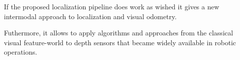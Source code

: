 \documentclass[doktyp=marbeit,fontsize=12pt,sprache=english,draft=true,hausschrift=true]{TUBAFarbeiten}
\begin{document}
If the proposed localization pipeline does work as wished it gives a new
intermodal approach to localization and visual odometry.

Futhermore, it allows to apply algorithms and approaches from the
classical visual feature-world to depth sensors that became widely
available in robotic operations.

% 
%
% 
% 
% 
% 
% 
% 
% 

\begin{appendix}
    \newpage

    
    

    \newpage
    \listoftables

    \newpage
    \listoffigures

\end{appendix}
\end{document}
